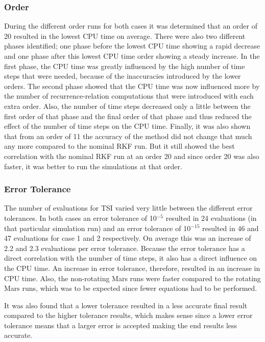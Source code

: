 \subsubsection{Order}
During the different order runs for both cases it was determined that an order of 20 resulted in the lowest CPU time on average. There were also two different phases identified; one phase before the lowest CPU time showing a rapid decrease and one phase after this lowest CPU time order showing a steady increase. In the first phase, the CPU time was greatly influenced by the high number of time steps that were needed, because of the inaccuracies introduced by the lower orders. The second phase showed that the CPU time was now influenced more by the number of recurrence-relation computations that were introduced with each extra order. Also, the number of time steps decreased only a little between the first order of that phase and the final order of that phase and thus reduced the effect of the number of time steps on the CPU time. Finally, it was also shown that from an order of 11 the accuracy of the method did not change that much any more compared to the nominal \ac{RKF} run. But it still showed the best correlation with the nominal \ac{RKF} run at an order 20 and since order 20 was also faster, it was better to run the simulations at that order.

\subsubsection{Error Tolerance}
The number of evaluations for \ac{TSI} varied very little between the different error tolerances. In both cases an error tolerance of 10$^{-5}$ resulted in 24 evaluations (in that particular simulation run) and an error tolerance of 10$^{-15}$ resulted in 46 and 47 evaluations for case 1 and 2 respectively. On average this was an increase of 2.2 and 2.3 evaluations per error tolerance. Because the error tolerance has a direct correlation with the number of time steps, it also has a direct influence on the CPU time. An increase in error tolerance, therefore, resulted in an increase in CPU time. Also, the non-rotating Mars runs were faster compared to the rotating Mars runs, which was to be expected since fewer equations had to be performed. 

It was also found that a lower tolerance resulted in a less accurate final result compared to the higher tolerance results, which makes sense since a lower error tolerance means that a larger error is accepted making the end results less accurate.


